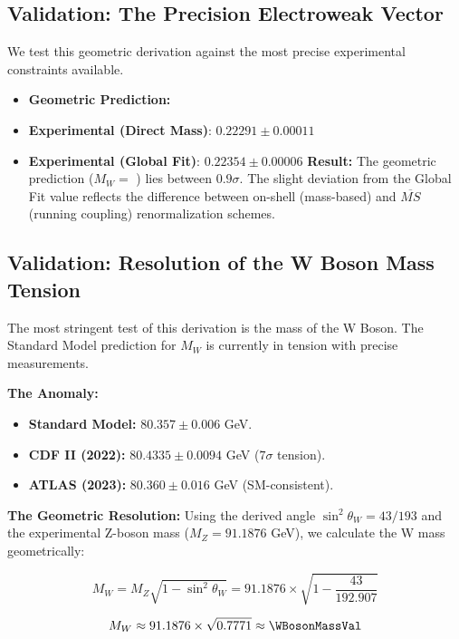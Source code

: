 \subsection{Validation: The Precision Electroweak Vector}

We test this geometric derivation against the most precise experimental constraints available.

\begin{itemize}
    \item \textbf{Geometric Prediction:} \WeakAngleVal
    \item \textbf{Experimental (Direct Mass)}: $0.22291 \pm 0.00011$ \cite{navas_review_2024}
    \item \textbf{Experimental (Global Fit)}: $0.22354 \pm 0.00006$
    \textbf{Result:} The geometric prediction ($M_W = $ \WBosonMassVal) lies between $0.9\sigma$. The slight deviation from the Global Fit value reflects the difference between on-shell (mass-based) and $\overline{MS}$ (running coupling) renormalization schemes.
\end{itemize}

\subsection{Validation: Resolution of the W Boson Mass Tension}

The most stringent test of this derivation is the mass of the W Boson. The Standard Model prediction for $M_W$ is currently in tension with precise measurements.

\textbf{The Anomaly:}
\begin{itemize}
    \item \textbf{Standard Model:} $80.357 \pm 0.006$ GeV.
    \item \textbf{CDF II (2022):} $80.4335 \pm 0.0094$ GeV ($7\sigma$ tension).
    \item \textbf{ATLAS (2023):} $80.360 \pm 0.016$ GeV (SM-consistent).
\end{itemize}

\textbf{The Geometric Resolution:}
Using the derived angle $\sin^2 \theta_W = 43/193$ and the experimental Z-boson mass ($M_Z = 91.1876$ GeV), we calculate the W mass geometrically:

\begin{equation}
M_W = M_Z \sqrt{1 - \sin^2 \theta_W} = 91.1876 \times \sqrt{1 - \frac{43}{192.907}}
\end{equation}

\begin{equation}
M_W \approx 91.1876 \times \sqrt{0.7771} \approx \WBosonMassVal
\end{equation}

